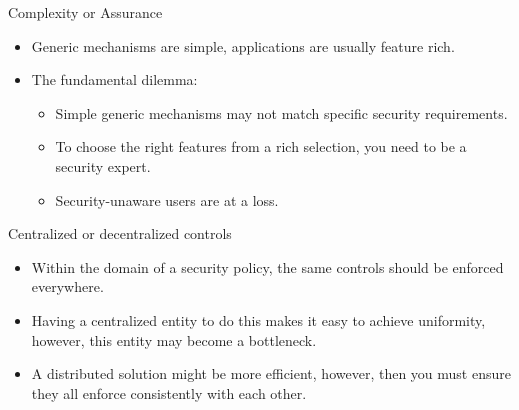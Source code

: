 
\begin{frame}
  \begin{block}{Complexity or Assurance}
    \begin{itemize}
      \item Generic mechanisms are simple, applications are usually feature rich.

      \item The fundamental dilemma:
        \begin{itemize}
          \item Simple generic mechanisms may not match specific security 
            requirements.

          \item To choose the right features from a rich selection, you need to 
            be a security expert.

          \item Security-unaware users are at a loss.
        \end{itemize}
    \end{itemize}
  \end{block}
\end{frame}

\begin{frame}
  \begin{block}{Centralized or decentralized controls}
    \begin{itemize}
      \item Within the domain of a security policy, the same controls should be 
        enforced everywhere.

      \item Having a centralized entity to do this makes it easy to achieve 
        uniformity, however, this entity may become a bottleneck.

      \item A distributed solution might be more efficient, however, then you 
        must ensure they all enforce consistently with each other.
    \end{itemize}
  \end{block}
\end{frame}

